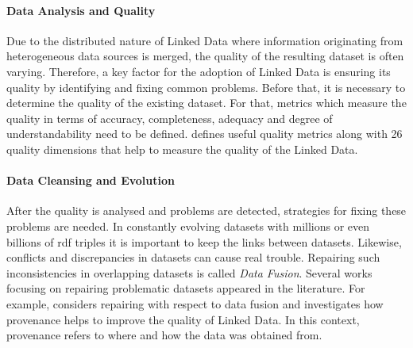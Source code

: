 \paragraph{Data Analysis and Quality}
Due to the distributed nature of Linked Data where information originating from heterogeneous data sources is merged, the quality of the resulting
dataset is often varying. Therefore, a key factor for the adoption of Linked Data is ensuring its quality by identifying and fixing common problems. Before that, it is necessary to determine the quality of the existing dataset. For that, metrics which measure the quality in terms of accuracy, completeness, adequacy and degree of understandability need to be defined. \cite{zaveri2016} defines useful quality metrics along with 26 quality dimensions that help to measure the quality of the Linked Data.

\paragraph{Data Cleansing and Evolution}
After the quality is analysed and problems are detected, strategies for fixing these problems are needed. In constantly evolving datasets with millions or even billions of \gls{rdf} triples it is important to keep the links between datasets. Likewise, conflicts and discrepancies in datasets can cause real trouble. Repairing such inconsistencies in overlapping datasets is called \emph{Data Fusion}. Several works focusing on repairing problematic datasets appeared in the literature. For example, \cite{mendes2012} considers repairing with respect to data fusion and \cite{flouris2012} investigates how provenance helps to improve the quality of Linked Data. In this context, provenance refers to where and how the data was obtained from. 

